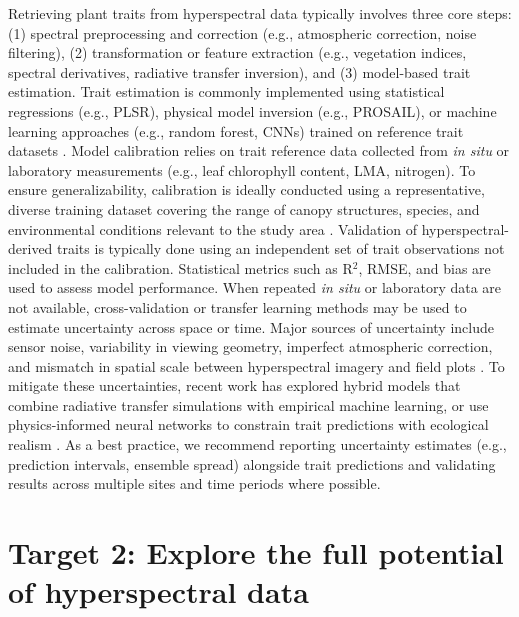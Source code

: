 \documentclass[pdflatex,sn-mathphys-num]{sn-jnl}%
\theoremstyle{thmstyleone}%
\theoremstyle{thmstyletwo}%
\theoremstyle{thmstylethree}%
\begin{document}
Retrieving plant traits from hyperspectral data typically involves three core steps: (1) spectral preprocessing and correction (e.g., atmospheric correction, noise filtering), (2) transformation or feature extraction (e.g., vegetation indices, spectral derivatives, radiative transfer inversion), and (3) model-based trait estimation. Trait estimation is commonly implemented using statistical regressions (e.g., PLSR), physical model inversion (e.g., PROSAIL), or machine learning approaches (e.g., random forest, CNNs) trained on reference trait datasets \citep{Blackburn2007, LeMaire2004, Cherif2023}. Model calibration relies on trait reference data collected from \textit{in situ} or laboratory measurements (e.g., leaf chlorophyll content, LMA, nitrogen). To ensure generalizability, calibration is ideally conducted using a representative, diverse training dataset covering the range of canopy structures, species, and environmental conditions relevant to the study area \citep{Verrelst2015, Kattenborn2019}. Validation of hyperspectral-derived traits is typically done using an independent set of trait observations not included in the calibration. Statistical metrics such as R$^2$, RMSE, and bias are used to assess model performance. When repeated \textit{in situ} or laboratory data are not available, cross-validation or transfer learning methods may be used to estimate uncertainty across space or time. Major sources of uncertainty include sensor noise, variability in viewing geometry, imperfect atmospheric correction, and mismatch in spatial scale between hyperspectral imagery and field plots \citep{Schweiger2020, Mederer2025}. To mitigate these uncertainties, recent work has explored hybrid models that combine radiative transfer simulations with empirical machine learning, or use physics-informed neural networks to constrain trait predictions with ecological realism \citep{Sun2024, She2024}. As a best practice, we recommend reporting uncertainty estimates (e.g., prediction intervals, ensemble spread) alongside trait predictions and validating results across multiple sites and time periods where possible.

\section{Target 2: Explore the full potential of hyperspectral data} \label{sec3}
\end{document}
